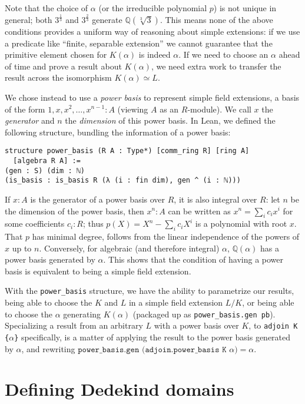 \documentclass[a4paper,USenglish,cleveref, autoref, thm-restate]{lipics-v2021}
\newcommand{\lean}[1]{\texttt{#1}\xspace} %
\newcommand{\Q}{\mathbb{Q}}
\begin{document}
Note that the choice of $\alpha$ (or the irreducible polynomial $p$) is not unique in general; both $3^\frac{1}{3}$ and $3^\frac{2}{3}$ generate $\Q(\sqrt[3]{3})$.
This means none of the above conditions provides a uniform way of reasoning about simple extensions:
if we use a predicate like ``finite, separable extension'' we cannot guarantee that the primitive element chosen for $K(\alpha)$ is indeed $\alpha$.
If we need to choose an $\alpha$ ahead of time and prove a result about $K(\alpha)$, we need extra work to transfer the result across the isomorphism $K(\alpha) \simeq L$.

We chose instead to use a \emph{power basis} to represent simple field extensions, a basis of the form $1, x, x^2, \dots, x^{n-1} : A$ (viewing $A$ as an $R$-module).
We call $x$ the \emph{generator} and $n$ the \emph{dimension} of this power basis.
In Lean, we defined the following structure, bundling the information of a power basis:
\begin{lstlisting}
structure power_basis (R A : Type*) [comm_ring R] [ring A]
  [algebra R A] :=
(gen : S) (dim : ℕ)
(is_basis : is_basis R (λ (i : fin dim), gen ^ (i : ℕ)))
\end{lstlisting}

If $x : A$ is the generator of a power basis over $R$, it is also integral over $R$:
let $n$ be the dimension of the power basis, then $x^n : A$ can be written as $x^n = \sum_i c_i x^i$ for some coefficients $c_i : R$;
thus $p(X) = X^n - \sum_i c_i X^i$ is a polynomial with root $x$.
That $p$ has minimal degree, follows from the linear independence of the powers of $x$ up to $n$.
Conversely, for algebraic (and therefore integral) $\alpha$, $\Q(\alpha)$ has a power basis generated by $\alpha$.
This shows that the condition of having a power basis is equivalent to being a simple field extension.

With the \lean{power\_basis} structure, we have the ability to parametrize our results,
being able to choose the $K$ and $L$ in a simple field extension $L / K$,
or being able to choose the $\alpha$ generating $K(\alpha)$ (packaged up as \lean{power\_basis.gen\ pb}).
Specializing a result from an arbitrary $L$ with a power basis over $K$, to \lean{adjoin K \{$\alpha$\}} specifically, is a matter of applying the result to the power basis generated by $\alpha$, and rewriting $\lean{power\_basis.gen (adjoin.power\_basis K $\alpha$)} = \alpha$.


\section{Defining Dedekind domains}
\end{document}
